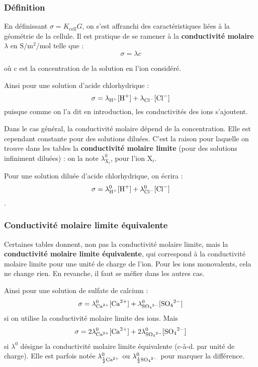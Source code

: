 \documentclass{tp}
\begin{document}
\subsubsection{Définition}

 En définissant $\sigma = K_\text{cell} G$, on s'est affranchi des caractéristiques liées à la géométrie de la cellule. Il est pratique de
se ramener à la \textbf{conductivité molaire} $\lambda$ en $\si{\siemens\per\square\meter\per\mol}$ telle que :
  \begin{equation}
    \sigma = \lambda  c
  \end{equation}

\noindent où $c$ est la concentration de la solution en l'ion considéré.


 Ainsi pour une solution d'acide chlorhydrique : 
\begin{equation}
  \sigma = \lambda_{\ce{H+}} [\ce{H+}] + \lambda_{\ce{Cl-}}  [\ce{Cl-}]
\end{equation}
puisque comme on l'a dit en introduction, les conductivités des ions s'ajoutent.


 Dans le cas général, la conductivité molaire dépend de la concentration. Elle est cependant constante pour des solutions diluées. C'est la raison pour laquelle on trouve dans les tables la \textbf{conductivité molaire limite} (pour des solutions infiniment diluées) : on la note $\lambda^0_{\text{X}_i}$, pour l'ion X$_i$.


 Pour une solution diluée d'acide chlorhydrique, on écrira : 
 \begin{equation}
   \sigma = \lambda^0_{\ce{H+}}  [\ce{H+}] + \lambda^0_{\ce{Cl-}}  [\ce{Cl-}]
 \end{equation}.

\subsubsection{Conductivité molaire limite équivalente}

 Certaines tables donnent, non pas la conductivité molaire limite, mais la \textbf{conductivité molaire limite équivalente}, qui correspond à la conductivité molaire limite pour une unité de charge de l'ion. Pour les ions monovalents, cela ne change rien. En revanche, il faut se méfier dans les autres cas.

 Ainsi pour une solution de sulfate de calcium : 
\begin{equation}
  \sigma = \lambda^0_{\ce{Ca^2+}} [\ce{Ca^2+}] + \lambda^0_{\ce{SO4^2-}} [\ce{SO4^2-}]
\end{equation}
si on utilise la conductivité molaire limite des ions. Mais 
\begin{equation}
  \sigma = 2 \lambda^0_{\ce{Ca^2+}} [\ce{Ca^2+}] + 2 \lambda^0_{\ce{SO4^2-}}  [\ce{SO4^2-}]
\end{equation}
si $\lambda^0$ désigne la conductivité molaire limite équivalente (c-à-d. par unité de charge). Elle est parfois notée $\lambda^0_{\frac{1}{2}\ce{Ca^2+}}$ ou $\lambda^0_{\frac{1}{2}\ce{SO4^2-}}$ pour marquer la différence.
\end{document}

